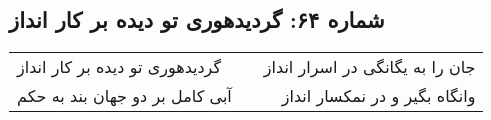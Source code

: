 \begin{center}
\section*{شماره ۶۴: گردیدهوری تو دیده بر کار انداز}
\label{sec:064}
\begin{longtable}{l p{0.5cm} r}
گردیدهوری تو دیده بر کار انداز
&&
جان را به یگانگی در اسرار انداز
\\
آبی کامل بر دو جهان بند به حکم
&&
وانگاه بگیر و در نمکسار انداز
\\
\end{longtable}
\end{center}
